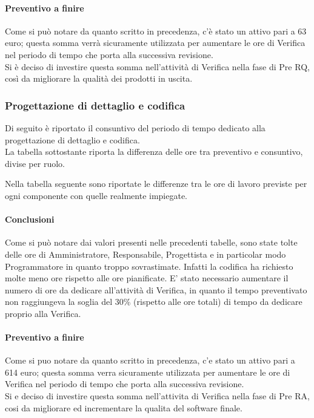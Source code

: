 \paragraph{Preventivo a finire}
Come si può notare da quanto scritto in precedenza, c'è stato un attivo pari a 63 euro; questa somma verrà sicuramente utilizzata per aumentare le ore di Verifica nel periodo di tempo che porta alla successiva revisione.\\
Si è deciso di investire questa somma nell'attività di Verifica nella fase di Pre RQ, così da migliorare la qualità dei prodotti in uscita.

\subsubsection{Progettazione di dettaglio e codifica}
Di seguito è riportato il consuntivo del periodo di tempo dedicato alla progettazione di dettaglio e codifica.\\
La tabella sottostante riporta la differenza delle ore tra preventivo e consuntivo, divise per ruolo.


Nella tabella seguente sono riportate le differenze tra le ore di lavoro previste per ogni componente con quelle realmente impiegate.


\paragraph{Conclusioni}
Come si può notare dai valori presenti nelle precedenti tabelle, sono state tolte delle ore di Amministratore, Responsabile, Progettista e in particolar modo Programmatore in quanto troppo sovrastimate.
Infatti la codifica ha richiesto molte meno ore rispetto alle ore pianificate.
E' stato necessario aumentare il numero di ore da dedicare all'attività di Verifica, in quanto il
tempo preventivato non raggiungeva la soglia del 30\% (rispetto alle ore totali) di tempo da dedicare
proprio alla Verifica.
\paragraph{Preventivo a finire}
Come si puo notare da quanto scritto in precedenza, c'e stato un attivo pari a 614 euro; questa somma verra sicuramente utilizzata per aumentare le ore di Verifica nel periodo di tempo che porta alla successiva revisione.\\
Si e deciso di investire questa somma nell'attivita di Verifica nella fase di Pre RA, cosi da migliorare
ed incrementare la qualita del software finale.